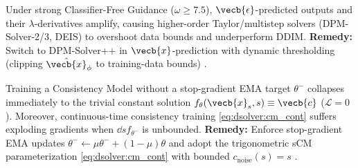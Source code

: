 \documentclass[../../../../master.tex]{subfiles}
\begin{document}
\begin{pitfall}
Under strong Classifier-Free Guidance ($\omega \ge 7.5$), $\vecb{\epsilon}$-predicted outputs and their $\lambda$-derivatives amplify, causing higher-order Taylor/multistep solvers (DPM-Solver-2/3, DEIS) to overshoot data bounds and underperform DDIM. \textbf{Remedy:} Switch to DPM-Solver++ in $\vecb{x}$-prediction with dynamic thresholding (clipping $\hat{\vecb{x}}_\phi$ to training-data bounds) .
\end{pitfall}

\begin{pitfall}
Training a Consistency Model without a stop-gradient EMA target $\theta^-$ collapses immediately to the trivial constant solution $f_\theta(\vecb{x}_s, s) \equiv \vecb{c}$ ($\mathcal{L}=0$). Moreover, continuous-time consistency training \eqref{eq:dsolver:cm_cont} suffers exploding gradients when $\dd{}{s}f_{\theta^-}$ is unbounded. \textbf{Remedy:} Enforce stop-gradient EMA updates $\theta^- \gets \mu\theta^- + (1-\mu)\theta$ and adopt the trigonometric sCM parameterization \eqref{eq:dsolver:cm_cont} with bounded $c_{\mathrm{noise}}(s) = s$ .
\end{pitfall}
\end{document}
